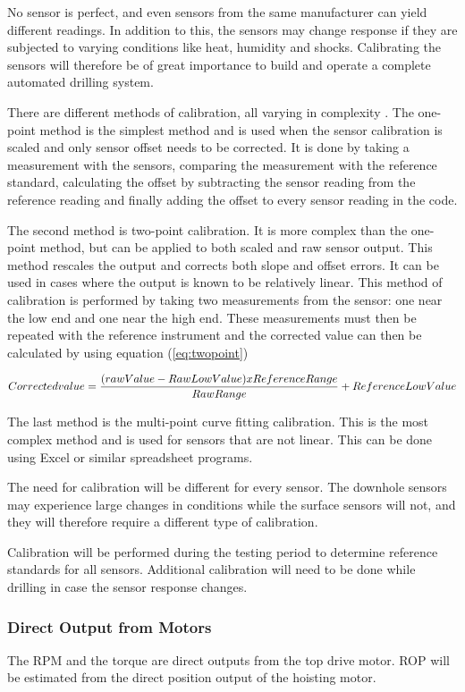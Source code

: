 No sensor is perfect, and even sensors from the same manufacturer can yield different readings. In addition to this, the sensors may change response if they are subjected to varying conditions like heat, humidity and shocks. Calibrating the sensors will therefore be of great importance to build and operate a complete automated drilling system. 

There are different methods of calibration, all varying in complexity \cite{ada}. The one-point method is the simplest method and is used when the sensor calibration is scaled and only sensor offset needs to be corrected. It is done by taking a measurement with the sensors, comparing the measurement with the reference standard, calculating the offset by subtracting the sensor reading from the reference reading and finally adding the offset to every sensor reading in the code.

The second method is two-point calibration. It is more complex than the one-point method, but can be applied to both scaled and raw sensor output. This method rescales the output and corrects both slope and offset errors. It can be used in cases where the output is known to be relatively linear. This method of calibration is performed by taking two measurements from the sensor: one near the low end and one near the high end. These measurements must then be repeated with the reference instrument and the corrected value can then be calculated by using equation (\ref{eq:twopoint})


\begin{equation}
\centering
   Corrected value = \frac{(raw Value - Raw Low Value) x Reference Range}{Raw Range}+Reference Low Value
\label{eq:twopoint}
\end{equation}

The last method is the multi-point curve fitting calibration. This is the most complex method and is used for sensors that are not linear. This can be done using Excel or similar spreadsheet programs. 

The need for calibration will be different for every sensor. The downhole sensors may experience large changes in conditions while the surface sensors will not, and they will therefore require a different type of calibration. 

Calibration will be performed during the testing period to determine reference standards for all sensors. Additional calibration will need to be done while drilling in case the sensor response changes. 

\subsubsection{Direct Output from Motors}
The RPM and the torque are direct outputs from the top drive motor. 
ROP will be estimated from the direct position output of the hoisting motor.

